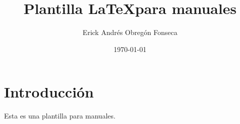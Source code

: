 \documentclass{article}
\title{Plantilla \LaTeX para manuales}
\author{Erick Andrés Obregón Fonseca}
\date{\today}
\begin{document}
\maketitle

\section{Introducción}

Esta es una plantilla para manuales.
\end{document}
